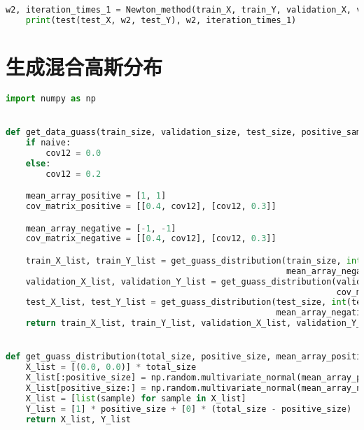 \documentclass[withoutpreface,bwprint]{cumcmthesis}
\begin{document}
\begin{appendix}
\begin{lstlisting}[language=python]
    w2, iteration_times_1 = Newton_method(train_X, train_Y, validation_X, validation_Y, newton_regulation_radio)
    print(test(test_X, w2, test_Y), w2, iteration_times_1)
\end{lstlisting}


\section{生成混合高斯分布}
\begin{lstlisting}[language=python]
import numpy as np


def get_data_guass(train_size, validation_size, test_size, positive_sample_radio, naive=True):
    if naive:
        cov12 = 0.0
    else:
        cov12 = 0.2

    mean_array_positive = [1, 1]
    cov_matrix_positive = [[0.4, cov12], [cov12, 0.3]]

    mean_array_negative = [-1, -1]
    cov_matrix_negative = [[0.4, cov12], [cov12, 0.3]]

    train_X_list, train_Y_list = get_guass_distribution(train_size, int(train_size * positive_sample_radio), mean_array_positive, cov_matrix_positive,
                                                        mean_array_negative, cov_matrix_negative)
    validation_X_list, validation_Y_list = get_guass_distribution(validation_size, int(validation_size * positive_sample_radio), mean_array_positive,
                                                                  cov_matrix_positive, mean_array_negative, cov_matrix_negative)
    test_X_list, test_Y_list = get_guass_distribution(test_size, int(test_size * positive_sample_radio), mean_array_positive, cov_matrix_positive,
                                                      mean_array_negative, cov_matrix_negative)
    return train_X_list, train_Y_list, validation_X_list, validation_Y_list, test_X_list, test_Y_list


def get_guass_distribution(total_size, positive_size, mean_array_positive, cov_matrix_positive, mean_array_negative, cov_matrix_negative):
    X_list = [(0.0, 0.0)] * total_size
    X_list[:positive_size] = np.random.multivariate_normal(mean_array_positive, cov_matrix_positive, size=positive_size)
    X_list[positive_size:] = np.random.multivariate_normal(mean_array_negative, cov_matrix_negative, size=total_size - positive_size)
    X_list = [list(sample) for sample in X_list]
    Y_list = [1] * positive_size + [0] * (total_size - positive_size)
    return X_list, Y_list
\end{lstlisting}


\end{appendix}
\end{document}
